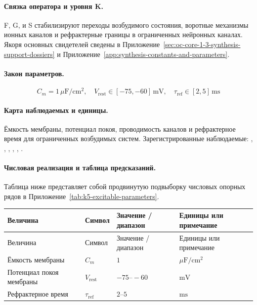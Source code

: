 \paragraph{Связка оператора и уровня K.}
F, G, и S стабилизируют переходы возбудимого состояния, воротные механизмы ионных каналов и рефрактерные границы в ограниченных нейронных каналах.
Якоря основных свидетелей сведены в Приложение~\ref{sec:oc-core-1-3-synthesis-support-dossiers} и Приложение~\ref{app:synthesis-constants-and-parameters}.

\paragraph{Закон параметров.}
\[
C_m = 1\,\mu\mathrm{F/cm^2},\quad V_{\mathrm{rest}} \in [-75,-60]\,\mathrm{mV},\quad \tau_{\mathrm{ref}} \in [2,5]\,\mathrm{ms}
\]

\paragraph{Карта наблюдаемых и единицы.}
Ёмкость мембраны, потенциал покоя, проводимость каналов и рефрактерное время для ограниченных возбудимых систем.
Зарегистрированные наблюдаемые: , \allowbreak {}, \allowbreak {}, \allowbreak {}, \allowbreak {}, \allowbreak {}.

\paragraph{Числовая реализация и таблица предсказаний.}
Таблица ниже представляет собой продвинутую подвыборку числовых опорных рядов в Приложение~\ref{tab:k5-excitable-parameters}.
\begin{longtable}{@{}L{0.27\textwidth}L{0.15\textwidth}L{0.24\textwidth}L{0.16\textwidth}@{}}
\toprule
Величина & Символ & Значение / диапазон & Единицы или примечание \\
\midrule
\endfirsthead
\toprule
Величина & Символ & Значение / диапазон & Единицы или примечание \\
\midrule
\endhead
Ёмкость мембраны & $\scriptstyle C_m$ & $1$ & $\mu\mathrm{F/cm^2}$ \\
Потенциал покоя мембраны & $\scriptstyle V_{\mathrm{rest}}$ & $-75\text{--}-60$ & $\mathrm{mV}$ \\
Рефрактерное время & $\scriptstyle \tau_{\mathrm{ref}}$ & $2\text{--}5$ & $\mathrm{ms}$ \\
\bottomrule
\end{longtable}

